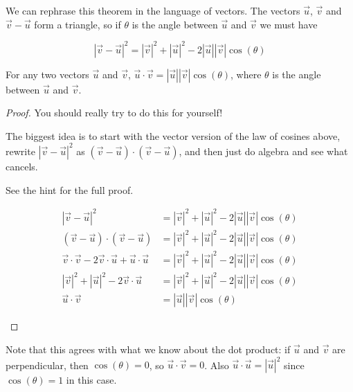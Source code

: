 \documentclass{ximera}
\begin{document}
We can rephrase this theorem in the language of vectors.  The vectors $\vec{u}$, $\vec{v}$ and $\vec{v} - \vec{u}$ form a triangle, so if $\theta$ is the angle between $\vec{u}$ and $\vec{v}$ we must have

\[
|\vec{v} - \vec{u}|^2=|\vec{v}|^2+|\vec{u}|^2-2|\vec{u}||\vec{v}|\cos(\theta)
\]



\begin{theorem}
	For any two vectors $\vec{u}$ and $\vec{v}$,  $\vec{u} \cdot \vec{v} = |\vec{u}||\vec{v}|\cos(\theta)$, where $\theta$ is the angle between $\vec{u}$ and $\vec{v}$.
\end{theorem}

\begin{proof}
	You should really try to do this for yourself!
	
	The biggest idea is to start with the vector version of the law of cosines above, rewrite $|\vec{v} - \vec{u}|^2$ as $(\vec{v} - \vec{u})\cdot(\vec{v} - \vec{u})$, and then just do algebra and see what cancels.
	
	See the hint for the full proof.
	
	\begin{hint}
		\begin{align*}
		|\vec{v} - \vec{u}|^2&=|\vec{v}|^2+|\vec{u}|^2-2|\vec{u}||\vec{v}|\cos(\theta)\\
		(\vec{v} - \vec{u})\cdot(\vec{v} - \vec{u}) &=|\vec{v}|^2+|\vec{u}|^2-2|\vec{u}||\vec{v}|\cos(\theta)\\
		\vec{v}\cdot\vec{v} -2\vec{v}\cdot\vec{u}+\vec{u}\cdot\vec{u}&=|\vec{v}|^2+|\vec{u}|^2-2|\vec{u}||\vec{v}|\cos(\theta)\\
		|\vec{v}|^2+|\vec{u}|^2 -2\vec{v}\cdot\vec{u} &=|\vec{v}|^2+|\vec{u}|^2-2|\vec{u}||\vec{v}|\cos(\theta)\\
		\vec{u} \cdot \vec{v} &= |\vec{u}||\vec{v}|\cos(\theta)
		\end{align*}
	
	\end{hint}
\end{proof}

Note that this agrees with what we know about the dot product:  if $\vec{u}$ and $\vec{v}$ are perpendicular, then $\cos(\theta) = 0$, so $\vec{u} \cdot \vec{v} = 0$.  Also $\vec{u} \cdot \vec{u} = |\vec{u}|^2$ since $\cos(\theta) = 1$ in this case.
\end{document}

